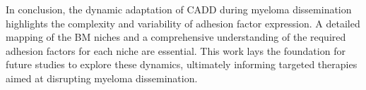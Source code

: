 In conclusion, the dynamic adaptation of \ac{CADD} during myeloma dissemination
highlights the complexity and variability of adhesion factor expression. A
detailed mapping of the BM niches and a comprehensive understanding of the
required adhesion factors for each niche are essential. This work lays the
foundation for future studies to explore these dynamics, ultimately informing
targeted therapies aimed at disrupting myeloma dissemination.












